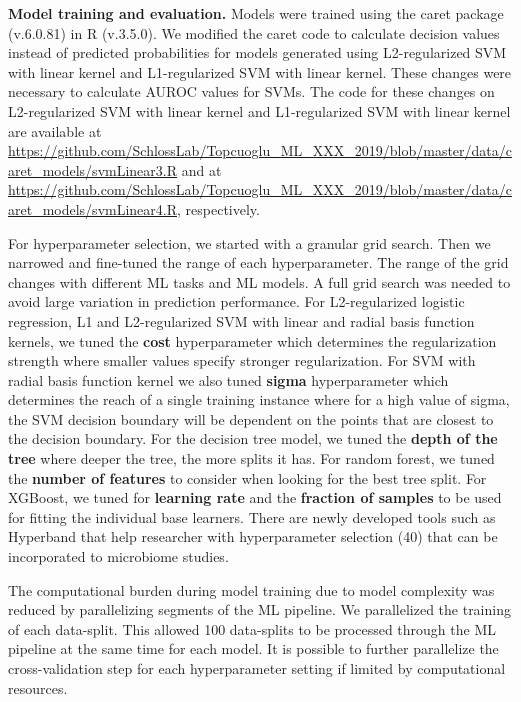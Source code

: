 \documentclass[11pt,]{article}
\begin{document}
\textbf{Model training and evaluation.} Models were trained using the
caret package (v.6.0.81) in R (v.3.5.0). We modified the caret code to
calculate decision values instead of predicted probabilities for models
generated using L2-regularized SVM with linear kernel and L1-regularized
SVM with linear kernel. These changes were necessary to calculate AUROC
values for SVMs. The code for these changes on L2-regularized SVM with
linear kernel and L1-regularized SVM with linear kernel are available at
\url{https://github.com/SchlossLab/Topcuoglu_ML_XXX_2019/blob/master/data/caret_models/svmLinear3.R}
and at
\url{https://github.com/SchlossLab/Topcuoglu_ML_XXX_2019/blob/master/data/caret_models/svmLinear4.R},
respectively.

For hyperparameter selection, we started with a granular grid search.
Then we narrowed and fine-tuned the range of each hyperparameter. The
range of the grid changes with different ML tasks and ML models. A full
grid search was needed to avoid large variation in prediction
performance. For L2-regularized logistic regression, L1 and
L2-regularized SVM with linear and radial basis function kernels, we
tuned the \textbf{cost} hyperparameter which determines the
regularization strength where smaller values specify stronger
regularization. For SVM with radial basis function kernel we also tuned
\textbf{sigma} hyperparameter which determines the reach of a single
training instance where for a high value of sigma, the SVM decision
boundary will be dependent on the points that are closest to the
decision boundary. For the decision tree model, we tuned the
\textbf{depth of the tree} where deeper the tree, the more splits it
has. For random forest, we tuned the \textbf{number of features} to
consider when looking for the best tree split. For XGBoost, we tuned for
\textbf{learning rate} and the \textbf{fraction of samples} to be used
for fitting the individual base learners. There are newly developed
tools such as Hyperband that help researcher with hyperparameter
selection (40) that can be incorporated to microbiome studies.

The computational burden during model training due to model complexity
was reduced by parallelizing segments of the ML pipeline. We
parallelized the training of each data-split. This allowed 100
data-splits to be processed through the ML pipeline at the same time for
each model. It is possible to further parallelize the cross-validation
step for each hyperparameter setting if limited by computational
resources.
\end{document}
